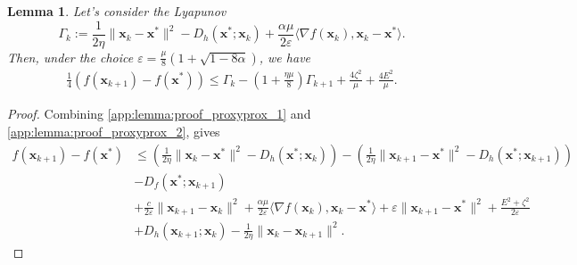 \documentclass{article}
\def\eps{{\varepsilon}}
\def\vx{{\bm{x}}}
\theoremstyle{plain}
\newtheorem{lemma}[theorem]{Lemma}
\theoremstyle{definition}
\theoremstyle{remark}
\begin{document}
\begin{lemma}
\label{app:lemma:proof_proxyprox_3}
    Let's consider the Lyapunov 
    \begin{equation}
    \label{app:eq:def_Lyapunov}
    \Gamma_{k} := \frac{1}{2\eta}\|\vx_k - \vx^*\|^2 - D_{h}(\vx^*;\vx_k) + \frac{\alpha \mu}{2 \eps} \langle \nabla f(\vx_k),\vx_k - \vx^*\rangle.
    \end{equation}
    Then, under the choice $\eps = \frac{\mu}{8}(1 + \sqrt{1 - 8\alpha})$, we have
    \begin{align*}
        \frac{1}{4}(f(\vx_{k+1}) - f(\vx^*)) 
        \le \Gamma_k - \left(1 +  \frac{\eta \mu}{8}\right)\Gamma_{k+1} + \frac{4\zeta^2}{\mu} + \frac{4E^2}{\mu}.
    \end{align*}
\end{lemma}
\begin{proof}
    Combining \cref{app:lemma:proof_proxyprox_1} and \cref{app:lemma:proof_proxyprox_2}, gives 
    \begin{align*}
        f(\vx_{k+1}) - f(\vx^*) &\le  \left(\frac{1}{2\eta}\|\vx_{k}- \vx^*\|^2 - D_{h}(\vx^*;\vx_{k})\right) - \left(\frac{1}{2\eta}\|\vx_{k+1}- \vx^*\|^2 - D_{h}(\vx^*;\vx_{k+1}) \right) \\
        &- D_f(\vx^*;\vx_{k+1})\\
        &+ \frac{c}{2\eps}\|\vx_{k+1} - \vx_k\|^2  + \frac{\alpha \mu }{2\eps} \langle\nabla f(\vx_k), \vx_k - \vx^* \rangle+ \eps\|\vx_{k+1}-\vx^*\|^2 + \frac{E^2 + \zeta^2}{2\eps}\\
        &+ D_h(\vx_{k+1};\vx_k) - \frac{1}{2\eta}\|\vx_{k}- \vx_{k+1}\|^2.
    \end{align*}
    

\end{proof}
\end{document}
